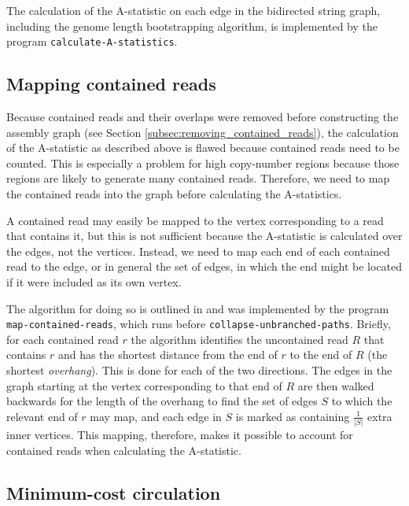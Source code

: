 \documentclass[10pt]{article}
\newcommand{\Subsection}[1]{Section \ref{#1}}
\newcommand{\KeyTerm}[1]{{\it #1}}
\newcommand{\ProgramName}[1]{{\tt #1}}
\begin{document}
The calculation of the A-statistic on each edge in the bidirected string graph,
including the genome length bootstrapping algorithm, is implemented by the
program {\tt calculate-A-statistics}.

\subsection{Mapping contained reads}

Because contained reads and their overlaps were removed before constructing the
assembly graph (see \Subsection{subsec:removing_contained_reads}), the
calculation of the A-statistic as described above is flawed because contained
reads need to be counted.  This is especially a problem for high copy-number
regions because those regions are likely to generate many contained reads.
Therefore, we need to map the contained reads into the graph before calculating
the A-statistics.

A contained read may easily be mapped to the vertex corresponding to a read that
contains it, but this is not sufficient because the A-statistic is calculated
over the edges, not the vertices.  Instead, we need to map each end of each
contained read to the edge, or in general the set of edges, in which the end
might be located if it were included as its own vertex.

The algorithm for doing so is outlined in \cite{Myers2005} and was implemented
by the program \ProgramName{map-contained-reads}, which runs before
\ProgramName{collapse-unbranched-paths}.  Briefly, for each contained read $r$
the algorithm identifies the uncontained read $R$ that contains $r$ and has the
shortest distance from the end of $r$ to the end of $R$ (the shortest
\KeyTerm{overhang}).  This is done for each of the two directions.  The edges in
the graph starting at the vertex corresponding to that end of $R$ are then
walked backwards for the length of the overhang to find the set of edges $S$ to
which the relevant end of $r$ may map, and each edge in $S$ is marked as
containing $\frac{1}{|S|}$ extra inner vertices.  This mapping, therefore, makes
it possible to account for contained reads when calculating the A-statistic.

\label{subsec:mapping_contained_reads}

\subsection{Minimum-cost circulation}
\end{document}
